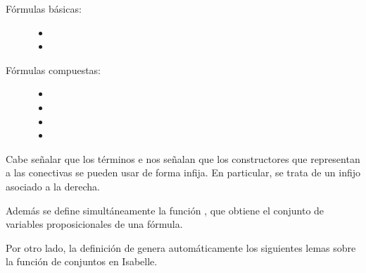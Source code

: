 \begin{isabellebody}
\begin{isamarkuptext}
  \begin{description}
    \item[Fórmulas básicas:]  
      \begin{itemize}
        \item {}
        \item {}
      \end{itemize}
    \item [Fórmulas compuestas:]
      \begin{itemize}
        \item {}
        \item {}
        \item {}
        \item {}
      \end{itemize}
  \end{description}

  Cabe señalar que los términos  e  nos señalan que 
  los constructores que representan a las conectivas se pueden usar de
  forma infija. En particular,  se trata de un infijo asociado a 
  la derecha.

  Además se define simultáneamente la función , que 
  obtiene el conjunto de variables proposicionales de una fórmula. 

  Por otro lado, la definición de  genera 
  automáticamente los siguientes lemas sobre la función de conjuntos 
   en Isabelle.
  

\end{isamarkuptext}
\end{isabellebody}
